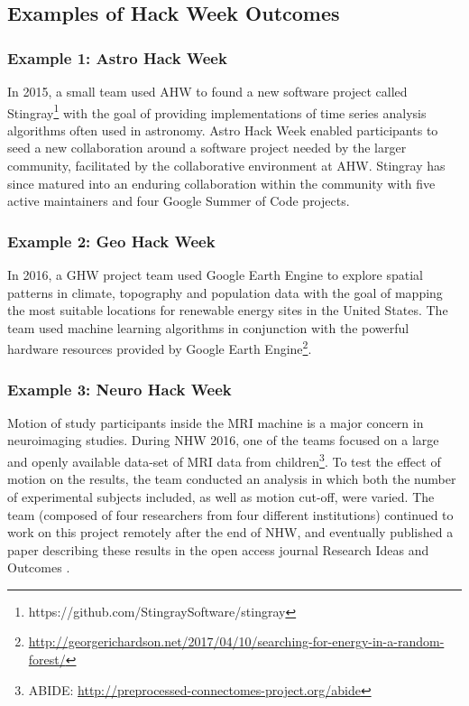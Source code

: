 \subsection*{Examples of Hack Week Outcomes}
\label{sec:outcomes}
\subsubsection*{Example 1: Astro Hack Week}
In 2015, a small team used AHW to found a new software project called Stingray\footnote{https://github.com/StingraySoftware/stingray} with the goal of providing implementations of time series analysis algorithms often used in astronomy.
Astro Hack Week enabled participants to seed a new collaboration around a software project needed by the larger community, facilitated by the collaborative environment at AHW.
Stingray has since matured into an enduring collaboration within the community with five active maintainers and four Google Summer of Code projects.
\subsubsection*{Example 2: Geo Hack Week}
In 2016, a GHW project team used Google Earth Engine to explore spatial patterns in climate, topography and population data with the goal of mapping the most suitable locations for renewable energy sites in the United States.
The team used machine learning algorithms in conjunction with the powerful hardware resources provided by Google Earth Engine\footnote{\url{http://georgerichardson.net/2017/04/10/searching-for-energy-in-a-random-forest/}}.
\subsubsection*{Example 3: Neuro Hack Week}
Motion of study participants inside the MRI machine is a major concern in neuroimaging studies.
During NHW 2016, one of the teams focused on a large and openly available data-set of MRI data from children\footnote{ABIDE: \url{http://preprocessed-connectomes-project.org/abide}}.
To test the effect of motion on the results, the team conducted an analysis in which both the number of experimental subjects included, as well as motion cut-off, were varied.
The team (composed of four researchers from four different institutions) continued to work on this project remotely after the end of NHW, and eventually published a paper describing these results in the open access journal Research Ideas and Outcomes \cite{leonard2017}.
